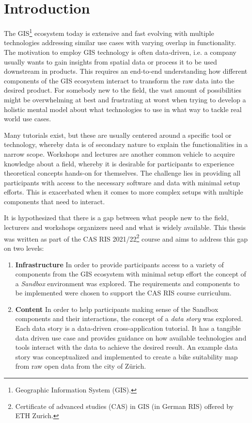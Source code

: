 \documentclass[11pt, a4paper, oneside, parskip=full-]{scrartcl}
\begin{document}
\section{Introduction}

The GIS\footnote{Geographic Information System (GIS).} ecosystem today is
extensive and fast evolving with multiple technologies addressing similar use
cases with varying overlap in functionality. The motivation to employ GIS
technology is often data-driven, i.e. a company usually wants to gain insights
from spatial data or process it to be used downstream in products. This requires
an end-to-end understanding how different components of the GIS ecosystem
interact to transform the raw data into the desired product. For somebody new to
the field, the vast amount of possibilities might be overwhelming at best and
frustrating at worst when trying to develop a holistic mental model about what
technologies to use in what way to tackle real world use cases.

Many tutorials exist, but these are usually centered around a specific tool or
technology, whereby data is of secondary nature to explain the functionalities
in a narrow scope. Workshops and lectures are another common vehicle to acquire
knowledge about a field, whereby it is desirable for participants to experience
theoretical concepts hands-on for themselves. The challenge lies in providing
all participants with access to the necessary software and data with minimal
setup efforts. This is exacerbated when it comes to more complex setups with
multiple components that need to interact.

It is hypothesized that there is a gap between what people new to the field,
lecturers and workshops organizers need and what is widely available. This
thesis was written as part of the CAS RIS 2021/22\footnote{Certificate of
advanced studies (CAS) in GIS (in German RIS) offered by ETH Zurich.} course and
aims to address this gap on two levels:
\begin{enumerate}
  \item \textbf{Infrastructure} In order to provide participants access to a
  variety of components from the GIS ecosystem with minimal setup effort the
  concept of a \emph{Sandbox} environment was explored. The requirements and
  components to be implemented were chosen to support the CAS RIS course
  curriculum.
  \item \textbf{Content} In order to help participants making sense of the
  Sandbox components and their interactions, the concept of a \emph{data story}
  was explored. Each data story is a data-driven cross-application tutorial. It
  has a tangible data driven use case and provides guidance on how available
  technologies and tools interact with the data to achieve the desired result.
  An example data story was conceptualized and implemented to create a bike
  suitability map from raw open data from the city of Zürich.
\end{enumerate}
\end{document}
